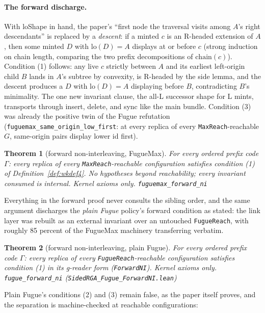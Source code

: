 \documentclass[11pt]{article}
\newtheorem{theorem}{Theorem}[section]
\newcommand{\lean}[1]{\texttt{#1}}
\newcommand{\code}[1]{\texttt{#1}}
\newcommand{\chain}{\mathrm{chain}}
\begin{document}
\paragraph{The forward discharge.} With loShape in hand, the paper's
``first node the traversal visits among $A$'s right descendants'' is
replaced by a \emph{descent}: if a minted $c$ is an R-headed extension
of $A$, then some minted $D$ with $\mathrm{lo}(D) = A$ displays at or
before $c$ (strong induction on chain length, comparing the two prefix
decompositions of $\chain(c)$). Condition (1) follows: any live $c$
strictly between $A$ and its earliest left-origin child $B$ lands in
$A$'s subtree by convexity, is R-headed by the side lemma, and the
descent produces a $D$ with $\mathrm{lo}(D) = A$ displaying before $B$,
contradicting $B$'s minimality. The one new invariant clause, the
all-L successor shape for L mints, transports through insert, delete,
and sync like the main bundle. Condition (3) was already the positive
twin of the Fugue refutation
(\lean{fuguemax\_same\_origin\_low\_first}: at every replica of every
\lean{MaxReach}-reachable $G$, same-origin pairs display lower id
first).

\begin{theorem}[forward non-interleaving, FugueMax]
\label{thm:fwdmax}
For every ordered prefix code $\Gamma$: every replica of every
\lean{MaxReach}-reachable configuration satisfies condition (1) of
Definition~\ref{def:wkdef4}. No hypotheses beyond reachability;
every invariant consumed is internal. Kernel axioms only.
\hfill\lean{fuguemax\_forward\_ni}
\end{theorem}

Everything in the forward proof never consults the sibling order, and
the same argument discharges the \emph{plain Fugue} policy's forward
condition as stated: the link layer was rebuilt as an external
invariant over an untouched \lean{FugueReach}, with roughly 85
percent of the FugueMax machinery transferring verbatim.

\begin{theorem}[forward non-interleaving, plain Fugue]
\label{thm:fwdfugue}
For every ordered prefix code $\Gamma$: every replica of every
\lean{FugueReach}-reachable configuration satisfies condition (1)
in its g-reader form (\lean{ForwardNI}). Kernel axioms only.
\hfill\lean{fugue\_forward\_ni}
(\code{SidedRGA\_Fugue\_ForwardNI.lean})
\end{theorem}

Plain Fugue's conditions (2) and (3) remain false, as the paper
itself proves, and the separation is machine-checked at reachable
configurations:
\end{document}
